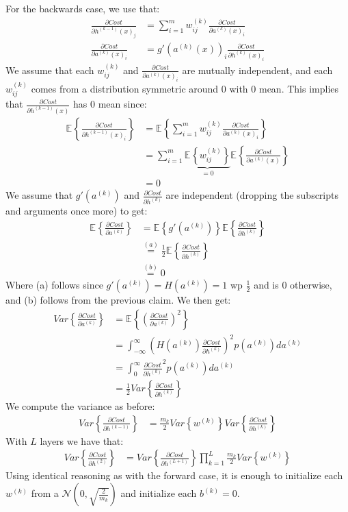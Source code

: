 \documentclass[paper=a4, fontsize=11pt]{scrartcl} %
\numberwithin{equation}{section} %
\numberwithin{figure}{section} %
\numberwithin{table}{section} %
\newcommand{\Ex}[2]{\mathbb{E}_{#1}\left\{#2\right\}}
\newcommand{\dP}[2]{\frac{\partial #1}{\partial #2}}
\begin{document}
For the backwards case, we use that:
\begin{align*}
\dP{Cost}{h^{(k-1)}(x)_j} &= \sum_{i=1}^m w_{ij}^{(k)} \dP{Cost}{a^{(k)}(x)_i}\\
\dP{Cost}{a^{(k)}(x)_i} &= g'(a^{(k)}(x))_i\dP{Cost}{h^{(k)}(x)_i}
\end{align*}
We assume that each $w_{ij}^{(k)}$ and $\dP{Cost}{a^{(k)}(x)_i}$ are mutually independent, and each $w_{ij}^{(k)}$ comes from a distribution symmetric around 0 with 0 mean. This implies that $\dP{Cost}{h^{(k-1)}(x)}$ has 0 mean since:
\begin{align*}
\Ex{}{\dP{Cost}{h^{(k-1)}(x)_i}}&=\Ex{}{\sum_{i=1}^m w_{ij}^{(k)} \dP{Cost}{a^{(k)}(x)_i}}\\
&= \sum_{i=1}^m\underbrace{\Ex{}{ w_{ij}^{(k)} }}_{=0} \Ex{}{\dP{Cost}{a^{(k)}(x)}} \\
&= 0
\end{align*}
We assume that $g'(a^{(k)})$ and $\dP{Cost}{h^{(k)}}$ are independent (dropping the subscripts and arguments once more) to get:
\begin{align*}
\Ex{}{\dP{Cost}{a^{(k)}}} &= \Ex{}{g'(a^{(k)})}\Ex{}{\dP{Cost}{h^{(k)}}}\\
&\overset{(a)}{=} \frac{1}{2}\Ex{}{\dP{Cost}{h^{(k)}}} \\
&\overset{(b)}{=} 0
\end{align*}
Where (a) follows since $g'(a^{(k)})=H(a^{(k)}) = 1$ wp $\frac{1}{2}$ and is $0$ otherwise, and (b) follows from the previous claim. We then get:
\begin{align*}
Var\left\{\dP{Cost}{a^{(k)}}\right\} &=\Ex{}{\left(\dP{Cost}{a^{(k)}}\right)^2} \\
&=\int_{-\infty}^{\infty} \left(H(a^{(k)}) \dP{Cost}{h^{(k)}}\right)^2 p(a^{(k)})da^{(k)}\\
&=\int_{0}^{\infty} \dP{Cost}{h^{(k)}}^2p(a^{(k)})da^{(k)}\\
&= \frac{1}{2}Var\left\{\dP{Cost}{h^{(k)}}\right\}
\end{align*}
We compute the variance as before: 
\begin{align*}
Var\left\{\dP{Cost}{h^{(k-1)}}\right\} &= \frac{m_k}{2} Var\left\{w^{(k)}\right\} Var\left\{\dP{Cost}{h^{(k)}}\right\}
\end{align*}
With $L$ layers we have that:
\begin{align*}
Var\left\{\dP{Cost}{h^{(2)}}\right\} &= Var\left\{\dP{Cost}{h^{(L+1)}}\right\} \prod_{k=1}^{L} \frac{m_k}{2} Var\left\{w^{(k)}\right\}
\end{align*}
Using identical reasoning as with the forward case, it is enough to initialize each $w^{(k)}$ from a $\mathcal{N}\left(0, \sqrt{\frac{2}{m_k}}\right)$ and initialize each $b^{(k)}=0$.
\newpage



\end{document}
